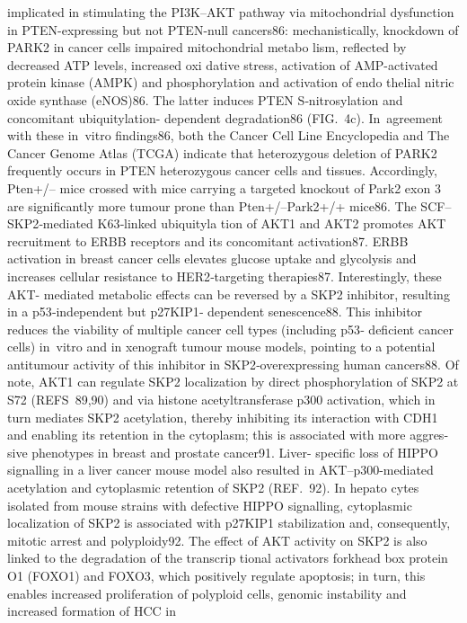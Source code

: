 implicated in stimulating the PI3K–AKT pathway via
mitochondrial dysfunction in PTEN-expressing but not
PTEN-null cancers86: mechanistically, knockdown of
PARK2 in ­cancer cells impaired mitochondrial metabo­
lism, reflected by decreased ATP levels, increased oxi­
dative stress, activation of AMP-activated protein kinase
(AMPK) and phosphorylation and activation of endo­
thelial nitric oxide synthase (eNOS)86. The latter induces
PTEN S‑nitrosylation and concomitant ubiquitylation-­
dependent degradation86 (FIG. 4c). In agreement with
these in vitro findings86, both the Cancer Cell Line
Encyclopedia and The Cancer Genome Atlas (TCGA)
indicate that heterozygous deletion of PARK2 frequently
occurs in PTEN heterozygous cancer cells and tissues.
Accordingly, Pten+/– mice crossed with mice carrying a
targeted knockout of Park2 exon 3 are significantly more
tumour prone than Pten+/–Park2+/+ mice86.
The SCF–SKP2‑mediated K63‑linked ubiquityla­
tion of AKT1 and AKT2 promotes AKT recruitment
to ERBB receptors and its concomitant activation87.
ERBB activation in breast cancer cells elevates glucose
uptake and glycolysis and increases cellular resistance
to HER2‑targeting therapies87. Interestingly, these AKT-
mediated metabolic effects can be reversed by a SKP2
inhibitor, resulting in a p53‑independent but p27KIP1‑­
dependent senescence88. This inhibitor reduces the
viability of multiple cancer cell types (including p53‑­
deficient cancer cells) in vitro and in xenograft tumour
mouse models, pointing to a potential anti­tumour
activity of this inhibitor in SKP2‑overexpressing human
­cancers88. Of note, AKT1 can regulate SKP2 localization
by direct phosphorylation of SKP2 at S72 (REFS 89,90)
and via histone acetyltransferase p300 activation, which
in turn mediates SKP2 acetylation, thereby inhibiting
its interaction with CDH1 and enabling its retention
in the cytoplasm; this is associated with more aggres­
sive pheno­types in breast and prostate cancer91. Liver-
specific loss of HIPPO signalling in a liver cancer mouse
model also resulted in AKT–p300-mediated acetylation
and cytoplasmic retention of SKP2 (REF. 92). In hepato­
cytes isolated from mouse strains with defective HIPPO
signalling, cytoplasmic localization of SKP2 is associated
with p27KIP1 stabilization and, consequently, mitotic
arrest and polyploidy92. The effect of AKT activity on
SKP2 is also linked to the degradation of the transcrip­
tional activators forkhead box protein O1 (FOXO1) and
FOXO3, which positively regulate apoptosis; in turn,
this enables increased proliferation of polyploid cells,
genomic instability and increased formation of HCC in

